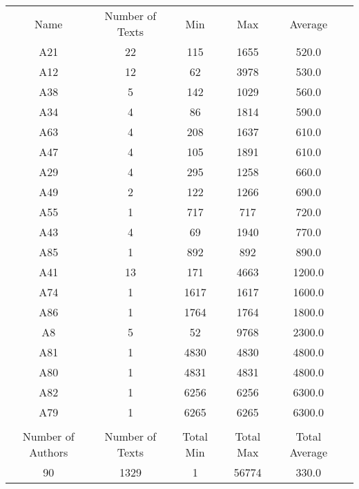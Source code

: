 \newpage
\begin{tabular}{cccccc}
Name & Number of Texts & Min & Max & Average\\
A21 & 22 & 115 & 1655 & 520.0\\
A12 & 12 & 62 & 3978 & 530.0\\
A38 & 5 & 142 & 1029 & 560.0\\
A34 & 4 & 86 & 1814 & 590.0\\
A63 & 4 & 208 & 1637 & 610.0\\
A47 & 4 & 105 & 1891 & 610.0\\
A29 & 4 & 295 & 1258 & 660.0\\
A49 & 2 & 122 & 1266 & 690.0\\
A55 & 1 & 717 & 717 & 720.0\\
A43 & 4 & 69 & 1940 & 770.0\\
A85 & 1 & 892 & 892 & 890.0\\
A41 & 13 & 171 & 4663 & 1200.0\\
A74 & 1 & 1617 & 1617 & 1600.0\\
A86 & 1 & 1764 & 1764 & 1800.0\\
A8 & 5 & 52 & 9768 & 2300.0\\
A81 & 1 & 4830 & 4830 & 4800.0\\
A80 & 1 & 4831 & 4831 & 4800.0\\
A82 & 1 & 6256 & 6256 & 6300.0\\
A79 & 1 & 6265 & 6265 & 6300.0\\
& & & & & \\ 
Number of Authors & Number of Texts & Total Min & Total Max & Total Average \\ 
90 & 1329 & 1 & 56774 & 330.0\\ 
\end{tabular}
